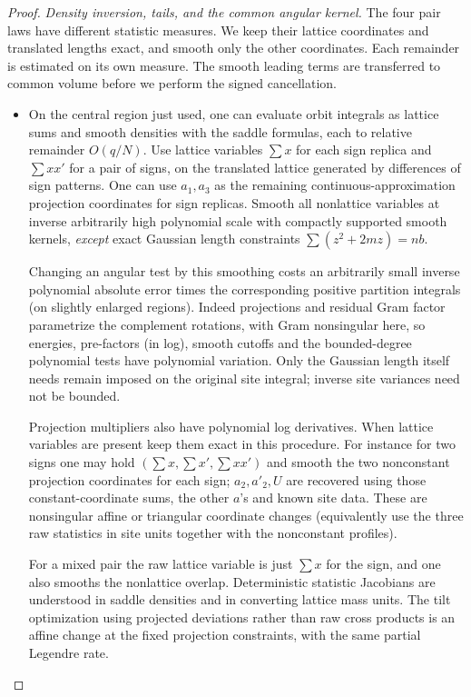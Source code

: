 \begin{proof}
\par\smallskip\noindent\textit{Density inversion, tails, and the common angular kernel.}\enspace
The four pair laws have different statistic measures. We keep their
lattice coordinates and translated lengths exact, and smooth only the
other coordinates. Each remainder is estimated on its own measure.
The smooth leading terms are transferred to common volume before we
perform the signed cancellation.

\begin{itemize}
\item On the central region just used, one can evaluate orbit integrals as lattice sums and smooth densities with the saddle formulas, each to relative remainder \(O(q/N)\). Use lattice variables \(\sum x\) for each sign replica and \(\sum xx'\) for a pair of signs, on the translated lattice generated by differences of sign patterns. One can use \(a_1,a_3\) as the remaining continuous-approximation projection coordinates for sign replicas. Smooth all nonlattice variables at inverse arbitrarily high polynomial scale with compactly supported smooth kernels, \emph{except} exact Gaussian length constraints \(\sum(z^2+2mz)=nb\).

Changing an angular test by this smoothing costs an arbitrarily small inverse polynomial absolute error times the corresponding positive partition integrals (on slightly enlarged regions). Indeed projections and residual Gram factor parametrize the complement rotations, with Gram nonsingular here, so energies, pre-factors (in log), smooth cutoffs and the bounded-degree polynomial tests have polynomial variation. Only the Gaussian length itself needs remain imposed on the original site integral; inverse site variances need not be bounded.

Projection multipliers also have polynomial log derivatives. When lattice variables are present keep them exact in this procedure. For instance for two signs one may hold \((\sum x,\sum x',\sum xx')\) and smooth the two nonconstant projection coordinates for each sign; \(a_2,a'_2,U\) are recovered using those constant-coordinate sums, the other \(a\)'s and known site data. These are nonsingular affine or triangular coordinate changes (equivalently use the three raw statistics in site units together with the nonconstant profiles).

For a mixed pair the raw lattice variable is just \(\sum x\) for the sign, and one also smooths the nonlattice overlap. Deterministic statistic Jacobians are understood in saddle densities and in converting lattice mass units. The tilt optimization using projected deviations rather than raw cross products is an affine change at the fixed projection constraints, with the same partial Legendre rate.


\end{itemize}
\end{proof}
